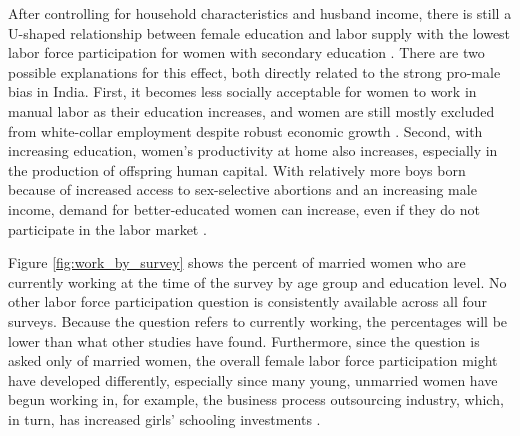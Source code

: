 \documentclass[12pt,letterpaper]{article}
\begin{document}
After controlling for household characteristics and husband income, there is
still a U-shaped relationship between female education and labor supply with the
lowest labor force participation for women with secondary education \citep{Chatterjee2018}.
There are two possible explanations for this effect, both directly related to the strong
pro-male bias in India.
First, it becomes less socially acceptable for women to work in manual labor as their
education increases, and women are still mostly excluded from white-collar
employment despite robust economic growth \citep{Klasen2015,Chatterjee2018}.
Second, with increasing education, women's productivity at home also increases, especially
in the production of offspring human capital.
With relatively more boys born because of increased access to sex-selective 
abortions and an increasing male income, demand for better-educated women can 
increase, even if they do not participate in the labor market \citep{Behrman1999}.

Figure \ref{fig:work_by_survey} shows the percent of married women who are 
currently working at the time of the survey by age group and education level.
No other labor force participation question is consistently available across all 
four surveys. 
Because the question refers to currently working, the percentages will be lower 
than what other studies have found. 
Furthermore, since the question is asked only of married women, the overall female labor 
force participation might have developed differently, especially since many young, 
unmarried women have begun working in, for example, the business process 
outsourcing industry, which, in turn, has increased girls' schooling investments
\citep{Jensen2012}.
\end{document}
